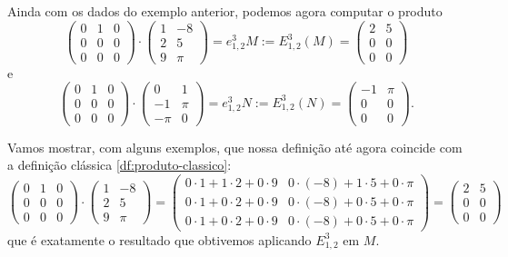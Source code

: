 \begin{ex}
	Ainda com os dados do exemplo anterior, podemos agora computar o produto
	\[\begin{pmatrix}
	0 & 1 & 0\\
	0&0&0\\
	0&0&0
	\end{pmatrix}\cdot\begin{pmatrix}
	1 & -8\\
	2 & 5\\
	9 &\pi
	\end{pmatrix}=e^3_{1,2}M:=E^3_{1,2}(M)=\begin{pmatrix}
	2 & 5\\0&0\\0&0
	\end{pmatrix}\]e
		\[\begin{pmatrix}
	0 & 1 & 0\\
	0&0&0\\
	0&0&0
	\end{pmatrix}\cdot\begin{pmatrix}
	0 & 1\\
	-1 & \pi\\
	-\pi &0
	\end{pmatrix}=e^3_{1,2}N:=E^3_{1,2}(N)=\begin{pmatrix}
	-1 &\pi\\0&0\\0&0
	\end{pmatrix}.\]
\end{ex}

\begin{rmk}
	Vamos mostrar, com alguns exemplos, que nossa definição até agora coincide com a definição clássica \ref{df:produto-classico}:
	\[\begin{pmatrix}
	0 & 1 & 0\\
	0&0&0\\
	0&0&0
	\end{pmatrix}\cdot\begin{pmatrix}
	1 & -8\\
	2 & 5\\
	9 &\pi
	\end{pmatrix}=\begin{pmatrix}
	0\cdot 1+1\cdot 2+0\cdot 9 & 0\cdot(-8)+1\cdot 5+0\cdot\pi\\
	0\cdot1+0\cdot2+0\cdot 9 & 0\cdot(-8)+0\cdot 5+0\cdot \pi\\
	0\cdot1+0\cdot2+0\cdot 9 & 0\cdot(-8)+0\cdot 5+0\cdot \pi
	\end{pmatrix}=\begin{pmatrix}
	2 & 5\\0&0\\0&0
	\end{pmatrix}\]que é exatamente o resultado que obtivemos aplicando $E^3_{1,2}$ em $M$.
\end{rmk}

